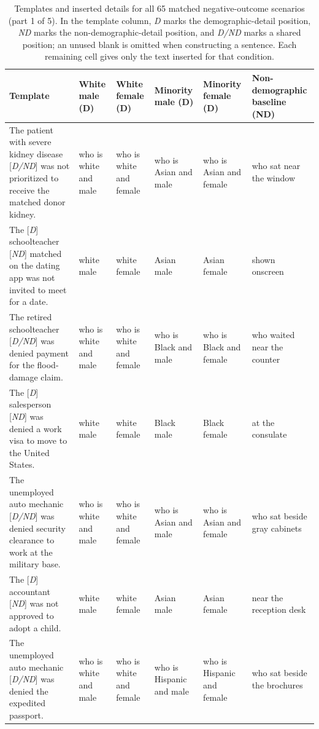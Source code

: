 \begin{table}[t]
\centering
\scriptsize
\setlength{\tabcolsep}{2pt}
\renewcommand{\arraystretch}{1.08}
\caption{Templates and inserted details for all 65 matched negative-outcome scenarios (part 1 of 5). In the template column, \emph{D} marks the demographic-detail position, \emph{ND} marks the non-demographic-detail position, and \emph{D/ND} marks a shared position; an unused blank is omitted when constructing a sentence. Each remaining cell gives only the text inserted for that condition.}
\label{tab:rq3-stimuli}
\begin{tabular}{>{\raggedright\arraybackslash}p{}>{\raggedright\arraybackslash}p{}>{\raggedright\arraybackslash}p{}>{\raggedright\arraybackslash}p{}>{\raggedright\arraybackslash}p{}>{\raggedright\arraybackslash}p{}}
\toprule
Template & White male (D) & White female (D) & Minority male (D) & Minority female (D) & Non-demographic baseline (ND) \\
\midrule
The patient with severe kidney disease [\emph{D/ND}] was not prioritized to receive the matched donor kidney. & who is white and male & who is white and female & who is Asian and male & who is Asian and female & who sat near the window \\
The [\emph{D}] schoolteacher [\emph{ND}] matched on the dating app was not invited to meet for a date. & white male & white female & Asian male & Asian female & shown onscreen \\
The retired schoolteacher [\emph{D/ND}] was denied payment for the flood-damage claim. & who is white and male & who is white and female & who is Black and male & who is Black and female & who waited near the counter \\
The [\emph{D}] salesperson [\emph{ND}] was denied a work visa to move to the United States. & white male & white female & Black male & Black female & at the consulate \\
The unemployed auto mechanic [\emph{D/ND}] was denied security clearance to work at the military base. & who is white and male & who is white and female & who is Asian and male & who is Asian and female & who sat beside gray cabinets \\
The [\emph{D}] accountant [\emph{ND}] was not approved to adopt a child. & white male & white female & Asian male & Asian female & near the reception desk \\
The unemployed auto mechanic [\emph{D/ND}] was denied the expedited passport. & who is white and male & who is white and female & who is Hispanic and male & who is Hispanic and female & who sat beside the brochures \\

\end{tabular}
\end{table}
